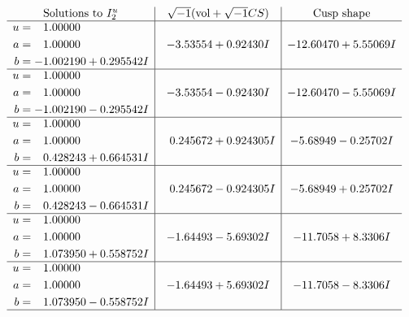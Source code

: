 \documentclass[1p]{elsarticle_modified}
\theoremstyle{definition}
\newcommand{\I}{\sqrt{-1}}
\begin{document}
$$\begin{array}{c|c|c}  
\text{Solutions to }I^u_{2}& \I (\text{vol} + \sqrt{-1}CS) & \text{Cusp shape}\\
 \hline 
\begin{aligned}
u &= \phantom{-}1.00000\phantom{ +0.000000I} \\
a &= \phantom{-}1.00000\phantom{ +0.000000I} \\
b &= -1.002190 + 0.295542 I\end{aligned}
 & -3.53554 + 0.92430 I & -12.60470 + 5.55069 I \\ \hline\begin{aligned}
u &= \phantom{-}1.00000\phantom{ +0.000000I} \\
a &= \phantom{-}1.00000\phantom{ +0.000000I} \\
b &= -1.002190 - 0.295542 I\end{aligned}
 & -3.53554 - 0.92430 I & -12.60470 - 5.55069 I \\ \hline\begin{aligned}
u &= \phantom{-}1.00000\phantom{ +0.000000I} \\
a &= \phantom{-}1.00000\phantom{ +0.000000I} \\
b &= \phantom{-}0.428243 + 0.664531 I\end{aligned}
 & \phantom{-}0.245672 + 0.924305 I & -5.68949 - 0.25702 I \\ \hline\begin{aligned}
u &= \phantom{-}1.00000\phantom{ +0.000000I} \\
a &= \phantom{-}1.00000\phantom{ +0.000000I} \\
b &= \phantom{-}0.428243 - 0.664531 I\end{aligned}
 & \phantom{-}0.245672 - 0.924305 I & -5.68949 + 0.25702 I \\ \hline\begin{aligned}
u &= \phantom{-}1.00000\phantom{ +0.000000I} \\
a &= \phantom{-}1.00000\phantom{ +0.000000I} \\
b &= \phantom{-}1.073950 + 0.558752 I\end{aligned}
 & -1.64493 - 5.69302 I & -11.7058 + 8.3306 I \\ \hline\begin{aligned}
u &= \phantom{-}1.00000\phantom{ +0.000000I} \\
a &= \phantom{-}1.00000\phantom{ +0.000000I} \\
b &= \phantom{-}1.073950 - 0.558752 I\end{aligned}
 & -1.64493 + 5.69302 I & -11.7058 - 8.3306 I\\
 \hline 
 \end{array}$$\newpage\newpage\renewcommand{\arraystretch}{1}
\end{document}
